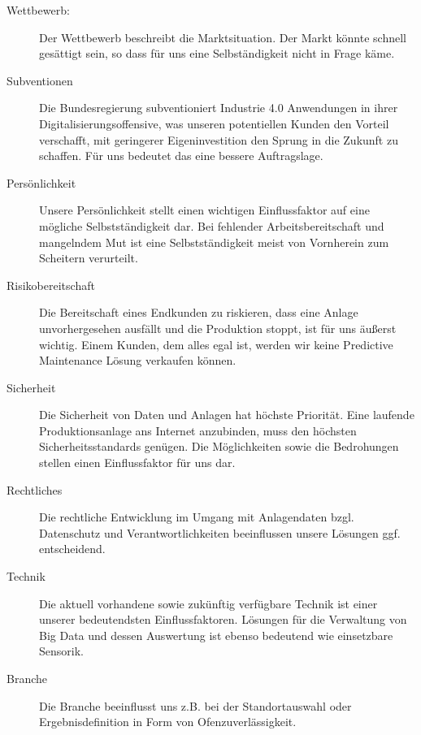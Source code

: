 \begin{description}
\item[Wettbewerb:]{Der Wettbewerb beschreibt die Marktsituation. Der Markt könnte schnell gesättigt sein, so dass für uns eine Selbständigkeit nicht in Frage käme. }

\item[Subventionen]{Die Bundesregierung subventioniert Industrie 4.0 Anwendungen in ihrer Digitalisierungsoffensive, was unseren potentiellen Kunden den Vorteil verschafft, mit geringerer Eigeninvestition den Sprung in die Zukunft zu schaffen. Für uns bedeutet das eine bessere Auftragslage.}

\item[Persönlichkeit]{Unsere Persönlichkeit stellt einen wichtigen Einflussfaktor auf eine mögliche Selbstständigkeit dar. Bei fehlender Arbeitsbereitschaft und mangelndem Mut ist eine Selbstständigkeit meist von Vornherein zum Scheitern verurteilt.}

\item[Risikobereitschaft]{Die Bereitschaft eines Endkunden zu riskieren, dass eine Anlage unvorhergesehen ausfällt und die Produktion stoppt, ist für uns äußerst wichtig. Einem Kunden, dem alles egal ist, werden wir keine Predictive Maintenance Lösung verkaufen können.}

\item[Sicherheit]{Die Sicherheit von Daten und Anlagen hat höchste Priorität. Eine laufende Produktionsanlage ans Internet anzubinden, muss den höchsten Sicherheitsstandards genügen. Die Möglichkeiten sowie die Bedrohungen stellen einen Einflussfaktor für uns dar.}

\item[Rechtliches]{Die rechtliche Entwicklung im Umgang mit Anlagendaten bzgl. Datenschutz und Verantwortlichkeiten beeinflussen unsere Lösungen ggf. entscheidend.}

\item[Technik]{Die aktuell vorhandene sowie zukünftig verfügbare Technik ist einer unserer bedeutendsten Einflussfaktoren. Lösungen für die Verwaltung von Big Data und dessen Auswertung ist ebenso bedeutend wie einsetzbare Sensorik.}

\item[Branche]{Die Branche beeinflusst uns z.B. bei der Standortauswahl oder Ergebnisdefinition in Form von Ofenzuverlässigkeit.}
\end{description}

